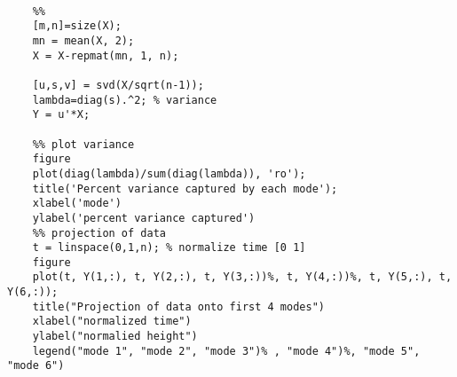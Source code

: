 \documentclass[12pt, a4paper]{article}
\begin{document}
\begin{verbatim}
    
    %%
    [m,n]=size(X);
    mn = mean(X, 2);
    X = X-repmat(mn, 1, n);
    
    [u,s,v] = svd(X/sqrt(n-1));
    lambda=diag(s).^2; % variance
    Y = u'*X;
    
    %% plot variance
    figure
    plot(diag(lambda)/sum(diag(lambda)), 'ro');
    title('Percent variance captured by each mode');
    xlabel('mode')
    ylabel('percent variance captured')
    %% projection of data
    t = linspace(0,1,n); % normalize time [0 1]
    figure
    plot(t, Y(1,:), t, Y(2,:), t, Y(3,:))%, t, Y(4,:))%, t, Y(5,:), t, Y(6,:));
    title("Projection of data onto first 4 modes")
    xlabel("normalized time")
    ylabel("normalied height")
    legend("mode 1", "mode 2", "mode 3")% , "mode 4")%, "mode 5", "mode 6")
\end{verbatim}
\end{document}
